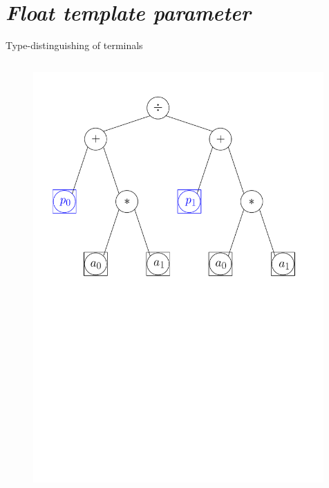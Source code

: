 \documentclass[xcolor=dvipsnames]{beamer}
\begin{document}
\section{\protect\textit{Float template parameter}}

\begin{frame}[fragile]{Type-distinguishing of terminals}
  \begin{columns}[T] %
    \begin{column}{0.75\textwidth}
      \begin{figure}[H]
        \centering
        \includegraphics[width=0.99\textwidth]{fig_exprtree_cb}
      \end{figure}
    \end{column}%
  \end{columns}
\end{frame}
\end{document}
